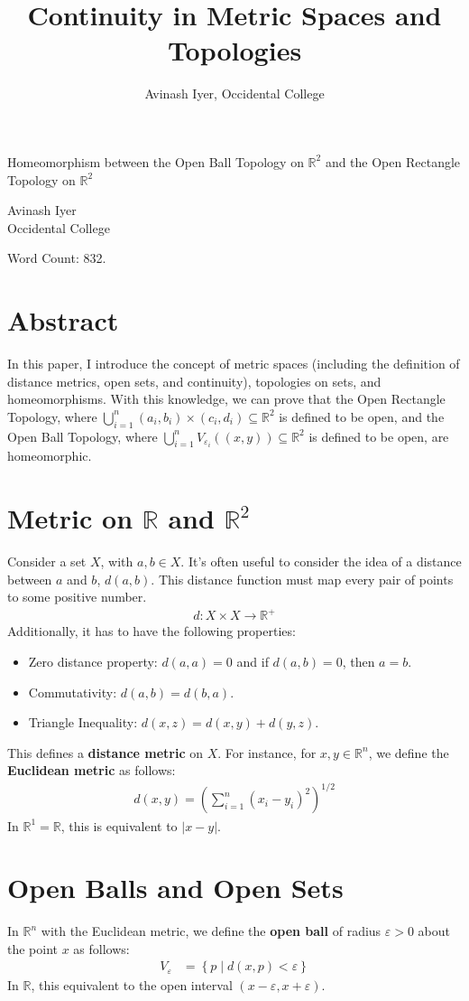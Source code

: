 \documentclass[12pt]{extarticle}
\title{Continuity in Metric Spaces and Topologies}
\author{Avinash Iyer, Occidental College}
\date{}
\newcommand{\R}{\mathbb{R}}
\begin{document}
\doublespacing
  \begin{center}
    \large \sc Homeomorphism between the Open Ball Topology on $\R^2$ and the Open Rectangle Topology on $\R^2$
  \end{center}
  \begin{center}
    Avinash Iyer\\
    Occidental College
  \end{center}
  Word Count: 832.
  \section*{Abstract}%
  In this paper, I introduce the concept of metric spaces (including the definition of distance metrics, open sets, and continuity), topologies on sets, and homeomorphisms. With this knowledge, we can prove that the Open Rectangle Topology, where $\bigcup_{i=1}^{n}(a_i,b_i)\times (c_i,d_i) \subseteq \R^2$ is defined to be open, and the Open Ball Topology, where $\bigcup_{i=1}^{n} V_{\varepsilon_i}((x,y))\subseteq \R^2$ is defined to be open, are homeomorphic.
  \section*{Metric on $\R$ and $\R^2$}%
  Consider a set $X$, with $a,b\in X$. It's often useful to consider the idea of a distance between $a$ and $b$, $d(a,b)$. This distance function must map every pair of points to some positive number.
  \begin{align*}
    d: X\times X \rightarrow \R^+
  \end{align*}
  Additionally, it has to have the following properties:
  \begin{itemize}
    \item Zero distance property: $d(a,a) = 0$ and if $d(a,b) = 0$, then $a = b$.
    \item Commutativity: $d(a,b) = d(b,a)$.
    \item Triangle Inequality: $d(x,z) = d(x,y) + d(y,z)$.
  \end{itemize}
  This defines a \textbf{distance metric} on $X$. For instance, for $x,y\in\R^n$, we define the \textbf{Euclidean metric} as follows:
  \begin{align*}
    d(x,y) = \left(\sum_{i=1}^{n}(x_i-y_i)^2\right)^{1/2}
  \end{align*}
  In $\R^1 = \R$, this is equivalent to $|x-y|$.
  \section*{Open Balls and Open Sets}%
  In $\R^n$ with the Euclidean metric, we define the \textbf{open ball} of radius $\varepsilon > 0$ about the point $x$ as follows:
  \begin{align*}
    V_{\varepsilon} &= \left\{p \mid d(x,p) < \varepsilon\right\}
  \end{align*}
  In $\R$, this equivalent to the open interval $(x-\varepsilon,x+\varepsilon)$.\\
\end{document}
